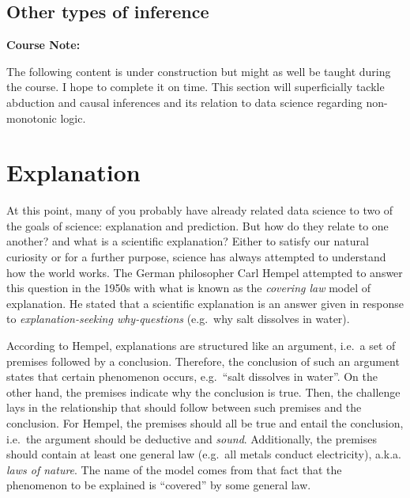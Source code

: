 \documentclass[
]{book}
\begin{document}
\hypertarget{other-types-of-inference}{%
\subsection{Other types of inference}\label{other-types-of-inference}}

\begin{notebox}

\begin{center}
\textbf{Course Note:}

\end{center}

The following content is under construction but might as well be taught during the course. I hope to complete it on time.
This section will superficially tackle abduction and causal inferences and its relation to data science regarding non-monotonic logic.

\end{notebox}

\hypertarget{explanation}{%
\section{Explanation}\label{explanation}}

At this point, many of you probably have already related data science to two of the goals of science: explanation and prediction. But how do they relate to one another? and what is a scientific explanation? Either to satisfy our natural curiosity or for a further purpose, science has always attempted to understand how the world works. The German philosopher Carl Hempel attempted to answer this question in the 1950s with what is known as the \emph{covering law} model of explanation. He stated that a scientific explanation is an answer given in response to \emph{explanation-seeking why-questions} (e.g.~why salt dissolves in water).

According to Hempel, explanations are structured like an argument, i.e.~a set of premises followed by a conclusion. Therefore, the conclusion of such an argument states that certain phenomenon occurs, e.g.~``salt dissolves in water''. On the other hand, the premises indicate why the conclusion is true. Then, the challenge lays in the relationship that should follow between such premises and the conclusion. For Hempel, the premises should all be true and entail the conclusion, i.e.~the argument should be deductive and \emph{sound}. Additionally, the premises should contain at least one general law (e.g.~all metals conduct electricity), a.k.a. \emph{laws of nature}. The name of the model comes from that fact that the phenomenon to be explained is ``covered'' by some general law.
\end{document}
